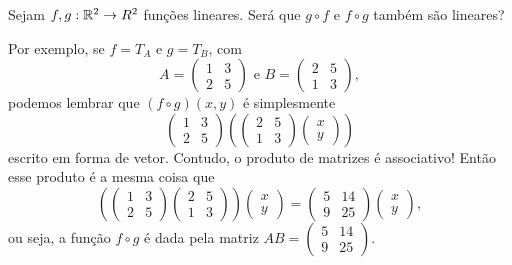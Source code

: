 \begin{ex}
	Sejam $f,g:\mathbb R^2\to R^2$ funções lineares. Será que $g\circ f$ e $f\circ g$ também são lineares?
	
	Por exemplo, se $f=T_A$ e $g=T_B$, com
	\[A=\begin{pmatrix}
	1&3\\
	2&5
	\end{pmatrix}\mbox{ e } B=\begin{pmatrix}
	2&5\\
	1&3
	\end{pmatrix},\] podemos lembrar que $(f\circ g)(x,y)$ é simplesmente
	\[\begin{pmatrix}
	1&3\\
	2&5
	\end{pmatrix}\left(\begin{pmatrix}
	2&5\\
	1&3
	\end{pmatrix}\begin{pmatrix}
	x\\y
	\end{pmatrix}\right)\]escrito em forma de vetor. Contudo, o produto de matrizes é associativo! Então esse produto é a mesma coisa que
	\[\left(\begin{pmatrix}
	1&3\\
	2&5
	\end{pmatrix}\begin{pmatrix}
	2&5\\
	1&3
	\end{pmatrix}\right)\begin{pmatrix}
	x\\y
	\end{pmatrix}=\begin{pmatrix}
	5&14\\9&25
	\end{pmatrix}\begin{pmatrix}
	x\\y
	\end{pmatrix},\] ou seja, a função $f\circ g$ é dada pela matriz $AB=\begin{pmatrix}
	5&14\\9&25
	\end{pmatrix}$.
	

\end{ex}
